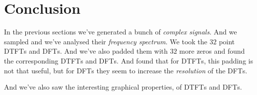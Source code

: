\documentclass[../../course]{subfiles}
\begin{document}
\section{Conclusion} \label{sec:conclusion}

In the previous sections we've generated a bunch of \emph{complex signals}. And
we sampled and we've analysed their \emph{frequency spectrum}. We took the
$32$ point \textsc{DTFT}s and \textsc{DFT}s. And we've also padded them with
$32$ more zeros and found the corresponding \textsc{DTFT}s and \textsc{DFT}s.
And found that for \textsc{DTFT}s, this padding is not that useful, but for
\textsc{DFT}s they seem to increase the \emph{resolution} of the \textsc{DFT}s.


And we've also saw the interesting graphical properties, of \textsc{DTFT}s and
\textsc{DFT}s.
\end{document}
